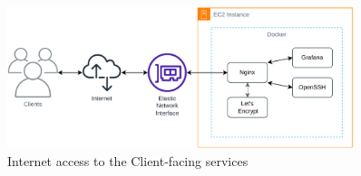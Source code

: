 \begin{figure}[!htbp]
    \centering
    \includegraphics[width=0.90\textwidth]{img/diagrams/pdf/old-arch-nginx.drawio.pdf}
    \caption[old-arch-nginx listing]{Internet access to the Client-facing services}
    \label{fig:old-arch-nginx}
\end{figure}
